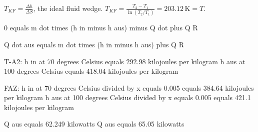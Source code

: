 \( T_{KF} = \frac{\Delta h}{\Delta S} \), the ideal fluid wedge.  
\( T_{KF} = \frac{T_2 - T_1}{\ln(T_2 / T_1)} = 203.12 \, \text{K} = T \).

0 equals m dot times (h in minus h aus) minus Q dot plus Q R  

Q dot aus equals m dot times (h in minus h aus) plus Q R  

T-A2:  
h in at 70 degrees Celsius equals 292.98 kilojoules per kilogram  
h aus at 100 degrees Celsius equals 418.04 kilojoules per kilogram  

FAZ:  
h in at 70 degrees Celsius divided by x equals 0.005 equals 384.64 kilojoules per kilogram  
h aus at 100 degrees Celsius divided by x equals 0.005 equals 421.1 kilojoules per kilogram  

Q aus equals 62.249 kilowatts  
Q aus equals 65.05 kilowatts